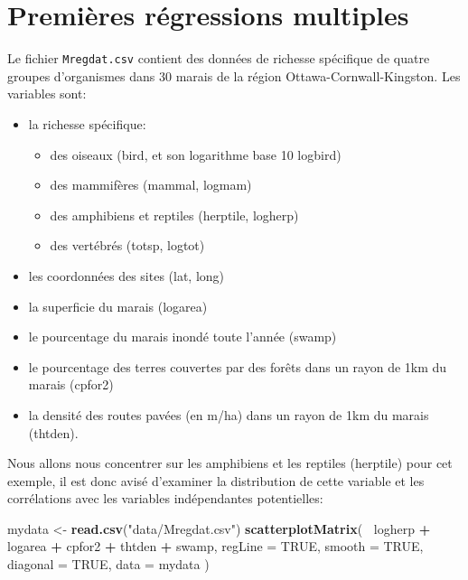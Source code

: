 \documentclass[12pt,]{book}
\newenvironment{Shaded}{\begin{snugshade}}{\end{snugshade}}
\newcommand{\DataTypeTok}[1]{\textcolor[rgb]{0.13,0.29,0.53}{#1}}
\newcommand{\KeywordTok}[1]{\textcolor[rgb]{0.13,0.29,0.53}{\textbf{#1}}}
\newcommand{\NormalTok}[1]{#1}
\newcommand{\OperatorTok}[1]{\textcolor[rgb]{0.81,0.36,0.00}{\textbf{#1}}}
\newcommand{\OtherTok}[1]{\textcolor[rgb]{0.56,0.35,0.01}{#1}}
\newcommand{\StringTok}[1]{\textcolor[rgb]{0.31,0.60,0.02}{#1}}
\providecommand{\tightlist}{%
  \setlength{\itemsep}{0pt}\setlength{\parskip}{0pt}}
\begin{document}
\hypertarget{premiuxe8res-ruxe9gressions-multiples}{%
\section{Premières régressions multiples}\label{premiuxe8res-ruxe9gressions-multiples}}

Le fichier \texttt{Mregdat.csv} contient des données de richesse spécifique de quatre groupes d'organismes dans 30 marais de la région Ottawa-Cornwall-Kingston. Les variables sont:

\begin{itemize}
\tightlist
\item
  la richesse spécifique:

  \begin{itemize}
  \tightlist
  \item
    des oiseaux (bird, et son logarithme base 10 logbird)
  \item
    des mammifères (mammal, logmam)
  \item
    des amphibiens et reptiles (herptile, logherp)
  \item
    des vertébrés (totsp, logtot)
  \end{itemize}
\item
  les coordonnées des sites (lat, long)
\item
  la superficie du marais (logarea)
\item
  le pourcentage du marais inondé toute l'année (swamp)
\item
  le pourcentage des terres couvertes par des forêts dans un rayon de 1km du marais (cpfor2)
\item
  la densité des routes pavées (en m/ha) dans un rayon de 1km du marais (thtden).
\end{itemize}

Nous allons nous concentrer sur les amphibiens et les reptiles (herptile) pour cet exemple, il est donc avisé d'examiner la distribution de cette variable et les corrélations avec les variables indépendantes potentielles:

\begin{Shaded}
\begin{Highlighting}[]
\NormalTok{mydata <-}\StringTok{ }\KeywordTok{read.csv}\NormalTok{(}\StringTok{"data/Mregdat.csv"}\NormalTok{)}
\KeywordTok{scatterplotMatrix}\NormalTok{(}
  \OperatorTok{~}\NormalTok{logherp }\OperatorTok{+}\StringTok{ }\NormalTok{logarea }\OperatorTok{+}\StringTok{ }\NormalTok{cpfor2 }\OperatorTok{+}\StringTok{ }\NormalTok{thtden }\OperatorTok{+}\StringTok{ }\NormalTok{swamp,}
  \DataTypeTok{regLine =} \OtherTok{TRUE}\NormalTok{, }\DataTypeTok{smooth =} \OtherTok{TRUE}\NormalTok{, }\DataTypeTok{diagonal =} \OtherTok{TRUE}\NormalTok{,}
  \DataTypeTok{data =}\NormalTok{ mydata}
\NormalTok{)}
\end{Highlighting}
\end{Shaded}
\end{document}
